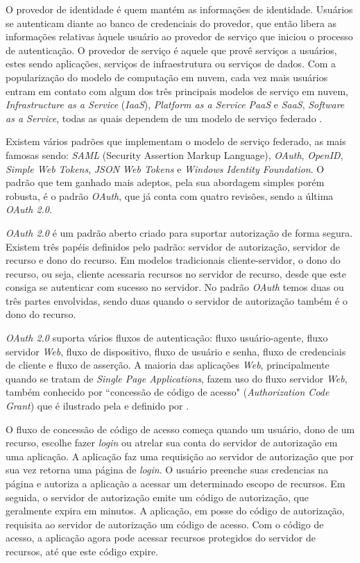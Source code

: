   O provedor de identidade é quem mantém as informações de identidade. Usuários 
  se autenticam diante ao banco de credenciais do provedor, que então libera as
  informações relativas àquele usuário ao provedor de serviço que iniciou o processo 
  de autenticação. O provedor de serviço é aquele que provê serviços a usuários, 
  estes sendo aplicações, serviços de infraestrutura ou serviços de dados. Com a popularização 
  do modelo de computação em nuvem, cada vez mais usuários entram em contato com algum dos três 
  principais modelos de serviço em nuvem,  \emph{Infrastructure as a Service} (\emph{IaaS}), 
  \emph{Platform as a Service} \emph{PaaS} e \emph{SaaS}, \emph{Software as a Service}, 
  todas as quais dependem de um modelo de serviço federado \cite{rountree2012federated}.

  Existem vários padrões que implementam o modelo de serviço federado, as mais famosas sendo:
  \emph{SAML} (Security Assertion Markup Language), \emph{OAuth}, \emph{OpenID}, 
  \emph{Simple Web Tokens}, \emph{JSON Web Tokens} e \emph{Windows Identity Foundation}. O 
  padrão que tem ganhado mais adeptos, pela sua abordagem simples porém robusta,
  é o padrão \emph{OAuth}, que já conta com quatro revisões, sendo a última
  \emph{OAuth 2.0}. 

  \emph{OAuth 2.0} é um padrão aberto criado para suportar autorização de forma segura. 
  Existem três papéis definidos pelo padrão: servidor de autorização, servidor de recurso e 
  dono do recurso. Em modelos tradicionais cliente-servidor, o dono do recurso, ou seja, cliente 
  acessaria recursos no servidor de recurso, desde que este consiga se autenticar com 
  sucesso no servidor. No padrão \emph{OAuth} temos duas ou três partes envolvidas, 
  sendo duas quando o servidor de autorização também é o dono do recurso.

  \emph{OAuth 2.0} suporta vários fluxos de autenticação: fluxo usuário-agente, 
  fluxo servidor \emph{Web}, fluxo de dispositivo, fluxo de usuário e senha, fluxo 
  de credenciais de cliente e fluxo de asserção. A maioria das aplicações \emph{Web}, 
  principalmente quando se tratam de \emph{Single Page Applications},
  fazem uso do fluxo servidor \emph{Web}, também 
  conhecido por ``concessão de código de acesso" (\emph{Authorization Code Grant})
  que é ilustrado pela  e definido por . 

  O fluxo de concessão de código de acesso começa quando um usuário, dono de um recurso, escolhe 
  fazer \emph{login} ou atrelar sua conta do servidor de autorização em uma aplicação. A aplicação 
  faz uma requisição ao servidor de autorização que por sua vez retorna uma página de \emph{login}. 
  O usuário preenche suas credencias na página e autoriza a aplicação a acessar um determinado 
  escopo de recursos. Em seguida, o servidor de autorização emite um código de autorização, 
  que geralmente expira em minutos. A aplicação, em posse do código de autorização, requisita 
  ao servidor de autorização um código de acesso. Com o código de acesso, a aplicação agora 
  pode acessar recursos protegidos do servidor de recursos, até que este código expire.

